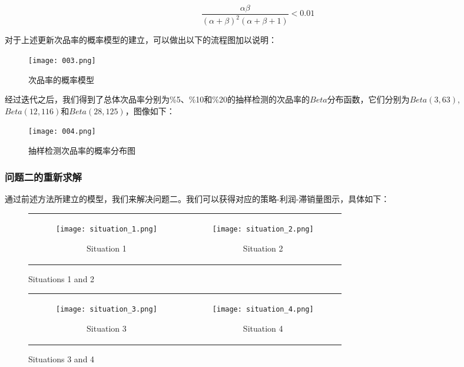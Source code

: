 \documentclass[utf8]{ctexart} %
\begin{document}
		\[  
		\frac{\alpha \beta}{(\alpha + \beta)^2 (\alpha + \beta + 1)} < 0.01 
		\]
		
		对于上述更新次品率的概率模型的建立，可以做出以下的流程图加以说明：
		
		\begin{figure}[H] %
			\centering
			\texttt{[image: 003.png]}
			\caption{次品率的概率模型}
			\label{fig:label}
		\end{figure}
		
		经过迭代之后，我们得到了总体次品率分别为\%5、\%10和\%20的抽样检测的次品率的$Beta$分布函数，它们分别为$Beta(3,63)$,$Beta(12,116)$和$Beta(28,125)$，图像如下：
		
		\begin{figure}[H] %
			\centering
			\texttt{[image: 004.png]}
			\caption{抽样检测次品率的概率分布图}
			\label{fig:label}
		\end{figure}

		\subsubsection{问题二的重新求解}
		通过前述方法所建立的模型，我们来解决问题二。我们可以获得对应的策略-利润-滞销量图示，具体如下：
				\begin{figure}[H]
			\centering
			\begin{tabular}{cc}
				\begin{subfigure}[b]{0.45\textwidth}
					\centering
					\texttt{[image: situation\_1.png]}
					\caption{Situation 1}
				\end{subfigure} &
				\begin{subfigure}[b]{0.45\textwidth}
					\centering
					\texttt{[image: situation\_2.png]}
					\caption{Situation 2}
				\end{subfigure} \\
			\end{tabular}
			\caption{Situations 1 and 2}
		\end{figure}
		
		\begin{figure}[H]
			\centering
			\begin{tabular}{cc}
				\begin{subfigure}[b]{0.45\textwidth}
					\centering
					\texttt{[image: situation\_3.png]}
					\caption{Situation 3}
				\end{subfigure} &
				\begin{subfigure}[b]{0.45\textwidth}
					\centering
					\texttt{[image: situation\_4.png]}
					\caption{Situation 4}
				\end{subfigure} \\
			\end{tabular}
			\caption{Situations 3 and 4}
		\end{figure}
		
\end{document}
